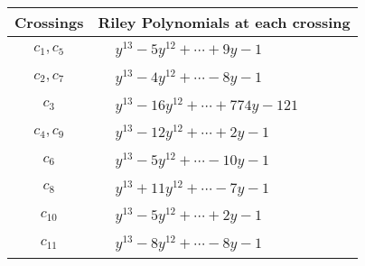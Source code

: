 \documentclass[1p]{elsarticle_modified}
\theoremstyle{definition}
\begin{document}
\begin{tabular}{m{50pt}|m{274pt}}
Crossings & \hspace{64pt}Riley Polynomials at each crossing \\
\hline $$\begin{aligned}c_{1},c_{5}\end{aligned}$$&$\begin{aligned}
&y^{13}-5 y^{12}+\cdots+9 y-1
\end{aligned}$\\
\hline $$\begin{aligned}c_{2},c_{7}\end{aligned}$$&$\begin{aligned}
&y^{13}-4 y^{12}+\cdots-8 y-1
\end{aligned}$\\
\hline $$\begin{aligned}c_{3}\end{aligned}$$&$\begin{aligned}
&y^{13}-16 y^{12}+\cdots+774 y-121
\end{aligned}$\\
\hline $$\begin{aligned}c_{4},c_{9}\end{aligned}$$&$\begin{aligned}
&y^{13}-12 y^{12}+\cdots+2 y-1
\end{aligned}$\\
\hline $$\begin{aligned}c_{6}\end{aligned}$$&$\begin{aligned}
&y^{13}-5 y^{12}+\cdots-10 y-1
\end{aligned}$\\
\hline $$\begin{aligned}c_{8}\end{aligned}$$&$\begin{aligned}
&y^{13}+11 y^{12}+\cdots-7 y-1
\end{aligned}$\\
\hline $$\begin{aligned}c_{10}\end{aligned}$$&$\begin{aligned}
&y^{13}-5 y^{12}+\cdots+2 y-1
\end{aligned}$\\
\hline $$\begin{aligned}c_{11}\end{aligned}$$&$\begin{aligned}
&y^{13}-8 y^{12}+\cdots-8 y-1
\end{aligned}$\\
\hline
\end{tabular}\\~\\
\end{document}
